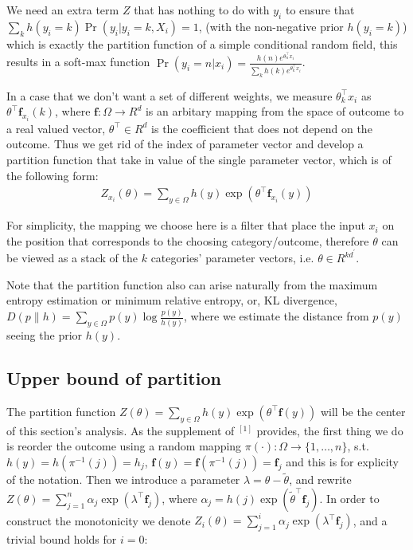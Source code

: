 \documentclass{article}
\begin{document}
     We need an extra term $Z$ that has nothing to do with $y_i$ to ensure that $\sum_{k} h(y_i = k)\Pr(y_i | y_i=k, X_i) = 1$, (with the non-negative prior $h(y_i = k)$) 
     which is exactly the partition function of a simple conditional random field, this results in a soft-max function 
     $\Pr(y_i = n|x_i) = \frac{h(n)e^{\theta_n^{\top}x_i}}{\sum_{k}h(k) e^{\theta_k^{\top}x_i}}$.

     In a case that we don't want a set of different weights, we measure $\theta_k^{\top}x_i$ as $\theta^{\top}\textbf{f}_{x_i}(k)$, where $\textbf{f}: \Omega \to R^d$ is
     an arbitary mapping from the space of outcome to a real valued vector, $\theta^{\top}\in R^d$ is the coefficient that does not depend on the outcome.
     Thus we get rid of the index of parameter vector and develop a partition function that take in value of the single parameter vector, which is of the following
     form:
     \begin{equation}
      \begin{aligned}
       Z_{x_i}(\theta ) = \sum_{y \in \Omega} h(y) \exp(\theta^{\top} \textbf{f}_{x_i}(y)) 
      \end{aligned}
     \end{equation}    

For simplicity, the mapping we choose here is a filter that place the input $x_i$ on the position that corresponds to the choosing category/outcome, therefore $\theta$
can be viewed as a stack of the $k$ categories' parameter vectors, i.e. $\theta \in R^{kd^{\prime}}$. 

Note that the partition function also can arise naturally from the maximum entropy estimation or minimum relative entropy, or, KL divergence, $D(p\lVert h) = \sum_{y\in \Omega} p(y ) \log \frac{p(y)}{h(y)}$, 
where we estimate the distance from $p(y)$ seeing the prior $h(y)$.


\subsection{Upper bound of partition}

The partition function $Z(\theta) =  \sum_{y \in \Omega} h(y) \exp(\theta^{\top} \textbf{f}(y))$ will be the center of this section's analysis.
As the supplement of $^{[1]}$ provides, the first thing we do is reorder the outcome using a random mapping $\pi(\cdot): \Omega \to \{1,\ldots,n\} $,
s.t. $h(y) = h(\pi^{-1}(j)) = h_j$, $\textbf{f}(y) = \textbf{f}(\pi^{-1}(j)) = \textbf{f}_j$ and this is for explicity of the notation. Then we introduce a parameter $\lambda = \theta - \tilde{\theta}$,
and rewrite $Z(\theta) = \sum_{j=1}^{n} \alpha_j \exp(\lambda^{\top}\textbf{f}_j)$, where $\alpha_j = h(j) \exp(\tilde{\theta}^{\top}\textbf{f}_j)$.
In order to construct the monotonicity we denote $Z_i(\theta) = \sum_{j=1}^{i}\alpha_j \exp(\lambda^{\top}\textbf{f}_j)$, and a trivial bound holds for $i=0$:
\end{document}
